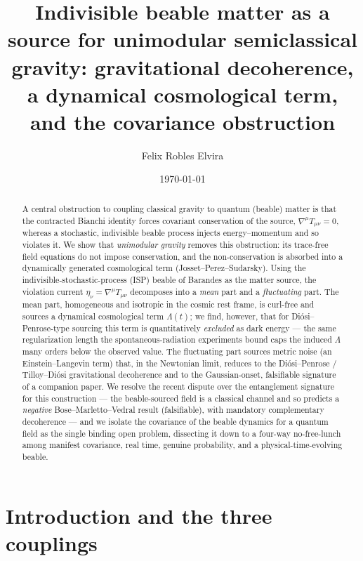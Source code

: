 \documentclass[aps,prd,preprint,amsmath,amssymb,nofootinbib,superscriptaddress]{revtex4-2}
\begin{document}
\title{Indivisible beable matter as a source for unimodular semiclassical gravity:
gravitational decoherence, a dynamical cosmological term, and the covariance obstruction}

\author{Felix Robles Elvira}
\date{\today}

\begin{abstract}
A central obstruction to coupling classical gravity to quantum (beable) matter is that
the contracted Bianchi identity forces covariant conservation of the source,
$\nabla^\mu T_{\mu\nu}=0$, whereas a stochastic, indivisible beable process injects
energy--momentum and so violates it. We show that \emph{unimodular gravity} removes this
obstruction: its trace-free field equations do not impose conservation, and the
non-conservation is absorbed into a dynamically generated cosmological term
(Josset--Perez--Sudarsky). Using the indivisible-stochastic-process (ISP) beable of
Barandes as the matter source, the violation current $\eta_\nu=\nabla^\mu T_{\mu\nu}$
decomposes into a \emph{mean} part and a \emph{fluctuating} part. The mean part,
homogeneous and isotropic in the cosmic rest frame, is curl-free and sources a dynamical
cosmological term $\Lambda(t)$; we find, however, that for Di\'osi--Penrose-type sourcing
this term is quantitatively \emph{excluded} as dark energy --- the same regularization
length the spontaneous-radiation experiments bound caps the induced $\Lambda$ many orders
below the observed value. The fluctuating part sources metric noise (an Einstein--Langevin
term) that, in the Newtonian limit, reduces to the Di\'osi--Penrose / Tilloy--Di\'osi
gravitational decoherence and to the Gaussian-onset, falsifiable signature of a companion
paper. We resolve the recent dispute over the entanglement signature for this construction
--- the beable-sourced field is a classical channel and so predicts a \emph{negative}
Bose--Marletto--Vedral result (falsifiable), with mandatory complementary decoherence ---
and we isolate the covariance of the beable dynamics for a quantum field as the single
binding open problem, dissecting it down to a four-way no-free-lunch among manifest
covariance, real time, genuine probability, and a physical-time-evolving beable.
\end{abstract}

\maketitle

\section{Introduction and the three couplings}
\end{document}
